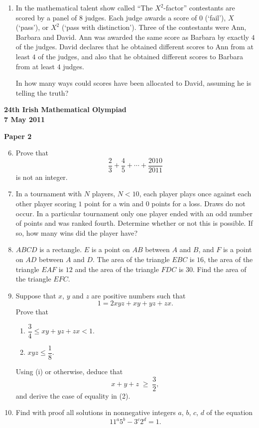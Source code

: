 \documentclass[12pt]{article}
\begin{document}
\begin{enumerate}
\begin{enumerate}
\item the four points $M$, $N$, $P$, $Q$ in appropriate order form a rectangle if and only if twice the radius of $\mathcal{C}_1$ is three times the radius of $\mathcal{C}_2$.
\end{enumerate}

\item In the mathematical talent show called ``The $X^2$-factor'' contestants are scored by a panel of $8$ judges. Each judge awards a score of $0$ (`fail'), $X$ (`pass'), or $X^2$ (`pass with distinction'). Three of the contestants were Ann, Barbara and David. Ann was awarded the same score as Barbara by exactly $4$ of the judges. David declares that he obtained different scores to Ann from at least $4$ of the judges, and also that he obtained different scores to Barbara from at least $4$ judges.

In how many ways could scores have been allocated to David, assuming he is telling the truth?
\end{enumerate}

\newpage
\begin{center}
{\large\bfseries 24th Irish Mathematical Olympiad\\7 May 2011}
\end{center}
\bigskip\noindent\textbf{Paper 2}\bigskip
\begin{enumerate}
\setcounter{enumi}{5}
\item Prove that
\[
\frac{2}{3} + \frac{4}{5} + \cdots + \frac{2010}{2011}
\]
is not an integer.

\item In a tournament with $N$ players, $N < 10$, each player plays once against each other player scoring $1$ point for a win and $0$ points for a loss. Draws do not occur. In a particular tournament only one player ended with an odd number of points and was ranked fourth. Determine whether or not this is possible. If so, how many wins did the player have?

\item $ABCD$ is a rectangle. $E$ is a point on $AB$ between $A$ and $B$, and $F$ is a point on $AD$ between $A$ and $D$. The area of the triangle $EBC$ is $16$, the area of the triangle $EAF$ is $12$ and the area of the triangle $FDC$ is $30$. Find the area of the triangle $EFC$.

\item Suppose that $x$, $y$ and $z$ are positive numbers such that
\[
1 = 2xyz + xy + yz + zx. \tag{1}
\]
Prove that
\begin{enumerate}
\item[(i)] $\dfrac{3}{4} \le xy + yz + zx < 1$.

\item[(ii)] $xyz \le \dfrac{1}{8}$.
\end{enumerate}
Using (i) or otherwise, deduce that
\[
x + y + z \;\ge\; \frac{3}{2}, \tag{2}
\]
and derive the case of equality in (2).

\item Find with proof all solutions in nonnegative integers $a$, $b$, $c$, $d$ of the equation
\[
11^a 5^b - 3^c 2^d = 1.
\]
\end{enumerate}
\end{document}
